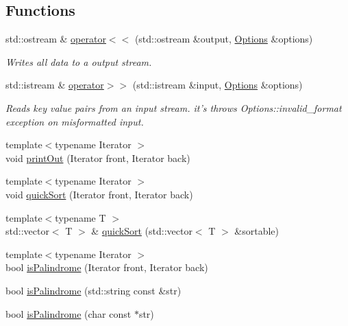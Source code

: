 \subsection*{Functions}
\begin{DoxyCompactItemize}
\item 
std\-::ostream \& \hyperlink{namespacesandbox_a8ca45cec79e562a7f2322662d281d1b4}{operator$<$$<$} (std\-::ostream \&output, \hyperlink{classsandbox_1_1_options}{Options} \&options)
\begin{DoxyCompactList}\small\item\em Writes all data to a output stream. \end{DoxyCompactList}\item 
std\-::istream \& \hyperlink{namespacesandbox_ab63c581d554f481ae6d06c434db5f7e5}{operator$>$$>$} (std\-::istream \&input, \hyperlink{classsandbox_1_1_options}{Options} \&options)
\begin{DoxyCompactList}\small\item\em Reads key value pairs from an input stream. it's throws Options\-::invalid\-\_\-format exception on misformatted input. \end{DoxyCompactList}\item 
{\footnotesize template$<$typename Iterator $>$ }\\void \hyperlink{namespacesandbox_a9f8d9538b5bfad2fd243b182598f994e}{print\-Out} (Iterator front, Iterator back)
\item 
{\footnotesize template$<$typename Iterator $>$ }\\void \hyperlink{namespacesandbox_a7d82a406c267d30ff1f27c5ff300437a}{quick\-Sort} (Iterator front, Iterator back)
\item 
{\footnotesize template$<$typename T $>$ }\\std\-::vector$<$ T $>$ \& \hyperlink{namespacesandbox_a85c255856530c2a1f629abb6bf2f4497}{quick\-Sort} (std\-::vector$<$ T $>$ \&sortable)
\item 
{\footnotesize template$<$typename Iterator $>$ }\\bool \hyperlink{namespacesandbox_a25a11dad06fc0cd1b3f9bc583f093636}{is\-Palindrome} (Iterator front, Iterator back)
\item 
bool \hyperlink{namespacesandbox_a4a569da66e67b46889d0c0597b7196b0}{is\-Palindrome} (std\-::string const \&str)
\item 
bool \hyperlink{namespacesandbox_a639859e1234594e142ea447fad2b3b34}{is\-Palindrome} (char const $\ast$str)
\item 

\end{DoxyCompactItemize}
